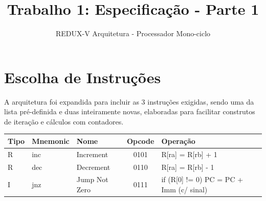 \documentclass[11pt,a4paper]{article}
\title{Trabalho 1: Especificação - Parte 1}
\author{REDUX-V Arquitetura - Processador Mono-ciclo}
\date{}
\begin{document}
\maketitle

\section{Escolha de Instruções}
A arquitetura foi expandida para incluir as 3 instruções exigidas, sendo uma da lista pré-definida e duas inteiramente novas, elaboradas para facilitar construtos de iteração e cálculos com contadores.

\begin{table}[H]
\centering
\begin{tabular}{lllcl}
\toprule
\textbf{Tipo} & \textbf{Mnemonic} & \textbf{Nome} & \textbf{Opcode} & \textbf{Operação} \\
\midrule
R & inc & Increment & 0101 & R[ra] = R[rb] + 1 \\
R & dec & Decrement & 0110 & R[ra] = R[rb] - 1 \\
I & jnz & Jump Not Zero & 0111 & if (R[0] != 0) PC = PC + Imm (c/ sinal) \\
\bottomrule
\end{tabular}
\end{table}
\end{document}
